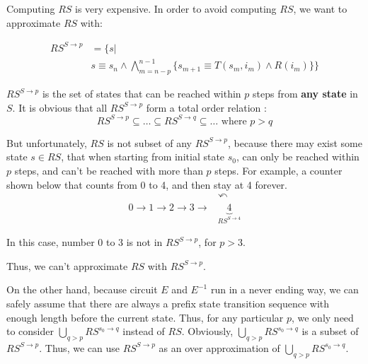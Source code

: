 \documentclass[journal]{IEEEtran}
\begin{document}
Computing $RS$ is very expensive.
In order to avoid computing $RS$,
we want to approximate $RS$ with:

\begin{equation}\label{apprse}
\begin{split}
RS^{S\to p} & =  \Big\{s| \\
& s\equiv s_n\wedge \bigwedge_{m=n-p}^{n-1}\big\{
s_{m+1}\equiv T(s_m,i_m)\wedge R(i_m)
\big\}\Big\}
\end{split}
\end{equation}

$RS^{S\to p}$ is the set of states that can be reached within $p$ steps from \textbf{any state} in $S$.
It is obvious that all $RS^{S\to p}$ form a total order relation :
\begin{displaymath}
RS^{S\to p}\subseteq\dots \subseteq RS^{S\to q}\subseteq\dots \textrm{  where } p>q
\end{displaymath}
%


But unfortunately,
$RS$ is not subset of any $RS^{S\to p}$,
because there may exist some state $s\in RS$,
that when starting from initial state $s_0$,
can only be reached within $p$ steps,
and can't be reached with more than $p$ steps.
For example,
a counter shown below that counts from 0 to 4,
and then stay at 4 forever.
\begin{displaymath}
\begin{array}{cc}
&\curvearrowleft \\
0\to 1\to 2\to 3\to & \underbrace{4}_{RS^{S\to 4}}
\end{array}
\end{displaymath}


In this case,
number 0 to 3 is not in $RS^{S\to p}$,
for $p>3$.

Thus,
we can't approximate $RS$ with $RS^{S\to p}$.

On the other hand,
because circuit $E$ and $E^{-1}$ run in a never ending way,
we can safely assume that there are always a prefix state transition sequence with enough length before the current state.
Thus,
for any particular $p$,
we only need to consider $\bigcup_{q>p}RS^{s_0\to q}$ instead of $RS$.
Obviously,
$\bigcup_{q>p}RS^{s_0\to q}$ is a subset of $RS^{S\to p}$.
Thus,
we can use $RS^{S\to p}$ as an over approximation of $\bigcup_{q>p}RS^{s_0\to q}$.
\end{document}

